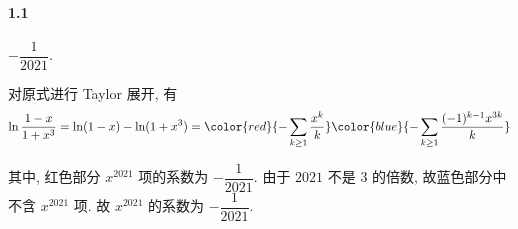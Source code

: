 \paragraph{1.1} $-\dfrac{1}{2021}$.

对原式进行 Taylor 展开, 有
\[
	\ln\dfrac{1-x}{1+x^3}=\ln(1-x)-\ln(1+x^3)=\color{red}{-\sum_{k\geq 1}\dfrac{x^k}{k}}\color{blue}{-\sum_{k\geq 1}\dfrac{(-1)^{k-1}x^{3k}}{k}}
\]

其中, 红色部分 $x^{2021}$ 项的系数为 $-\dfrac{1}{2021}$. 由于 $2021$ 不是 $3$ 的倍数, 故蓝色部分中不含 $x^{2021}$ 项. 故 $x^{2021}$ 的系数为 $-\dfrac{1}{2021}$.

